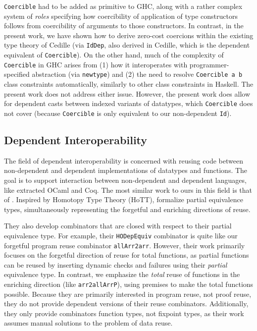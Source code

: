 \documentclass[acmsmall]{acmart}\settopmatter{}
\begin{document}
\verb|Coercible| had to be added as primitive to GHC, along with a
rather complex system of \emph{roles} specifying how coercibility of
application of type constructors follows from coercibility of
arguments to those constructors.  In contrast, in the present work, we
have shown how to derive zero-cost coercions
within the existing type
theory of Cedille (via \verb;IdDep;, also derived in Cedille, which
is the dependent equivalent of \verb|Coercible|).
On the other hand, much of the
complexity of \verb|Coercible| in GHC arises from (1) how it
interoperates with programmer-specified abstraction (via
\verb|newtype|) and (2) the need to resolve \verb|Coercible a b| class
constraints automatically, similarly to other class constraints in
Haskell.  The present work does not address either issue.
However, the present work does allow for dependent casts between
indexed variants of datatypes, which \verb|Coercible| does not cover
(because \verb|Coercible| is only equivalent to our non-dependent
\verb;Id;).

\subsection{Dependent Interoperability}

The field of dependent interoperability is concerned with reusing code
between non-dependent and dependent implementations of datatypes and
functions. The goal is to support interaction between non-dependent
and dependent languages, like extracted OCaml and Coq.
The most similar work to ours in this field is that of
\citet{dagand:interop}. Inspired by Homotopy Type Theory (HoTT),
\citet{dagand:interop} formalize partial equivalence types,
simultaneously representing the forgetful and enriching directions of reuse.

They also develop combinators that are closed with respect to their
partial equivalence type. For example, their \verb;HODepEquiv; combinator is
quite like our forgetful program reuse combinator
\verb;allArr2arr;. However, their work primarily focuses on the
forgetful direction of reuse for total functions, as partial functions
can be reused by inserting dynamic checks and failures using their
\textit{partial} equivalence type. In contrast, we emphasize the
\textit{total} reuse of functions in the enriching direction (like
\verb;arr2allArrP;), using premises to make the total functions
possible. Because they are primarily interested in program reuse, not
proof reuse, they do not provide dependent versions of their reuse
combinators. Additionally, they only provide combinators function
types, not fixpoint types, as their work assumes manual solutions to
the problem of data reuse.
\end{document}
